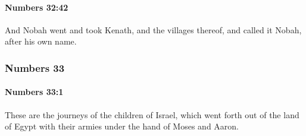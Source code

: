 		\paragraph{Numbers 32:42} %
			\label{NUMBERS-32-42}

			And Nobah went and took Kenath, and the villages thereof, and called it Nobah, after his own name.

	\subsubsection{Numbers 33} %
		\label{NUMBERS-33}

		\paragraph{Numbers 33:1} %
			\label{NUMBERS-33-1}

			These are the journeys of the children of Israel, which went forth out of the land of Egypt with their armies under the hand of Moses and Aaron.

